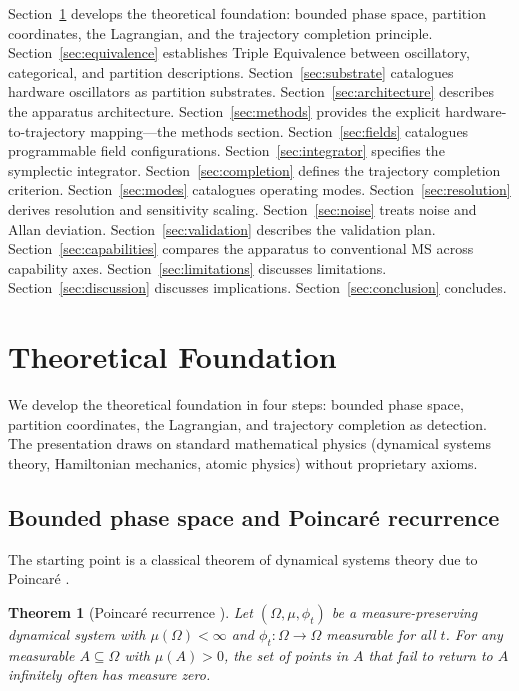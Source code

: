 \documentclass[twocolumn,11pt,a4paper]{article}
\newtheorem{theorem}{Theorem}[section]
\theoremstyle{definition}
\theoremstyle{remark}
\begin{document}
Section~\ref{sec:foundation} develops the theoretical foundation: bounded phase space, partition coordinates, the Lagrangian, and the trajectory completion principle. Section~\ref{sec:equivalence} establishes Triple Equivalence between oscillatory, categorical, and partition descriptions. Section~\ref{sec:substrate} catalogues hardware oscillators as partition substrates. Section~\ref{sec:architecture} describes the apparatus architecture. Section~\ref{sec:methods} provides the explicit hardware-to-trajectory mapping---the methods section. Section~\ref{sec:fields} catalogues programmable field configurations. Section~\ref{sec:integrator} specifies the symplectic integrator. Section~\ref{sec:completion} defines the trajectory completion criterion. Section~\ref{sec:modes} catalogues operating modes. Section~\ref{sec:resolution} derives resolution and sensitivity scaling. Section~\ref{sec:noise} treats noise and Allan deviation. Section~\ref{sec:validation} describes the validation plan. Section~\ref{sec:capabilities} compares the apparatus to conventional MS across capability axes. Section~\ref{sec:limitations} discusses limitations. Section~\ref{sec:discussion} discusses implications. Section~\ref{sec:conclusion} concludes.

\section{Theoretical Foundation}
\label{sec:foundation}

We develop the theoretical foundation in four steps: bounded phase space, partition coordinates, the Lagrangian, and trajectory completion as detection. The presentation draws on standard mathematical physics (dynamical systems theory, Hamiltonian mechanics, atomic physics) without proprietary axioms.

\subsection{Bounded phase space and Poincar\'{e} recurrence}

The starting point is a classical theorem of dynamical systems theory due to Poincar\'{e} \citep{poincare1890,arnold1989}.

\begin{theorem}[Poincar\'{e} recurrence \citep{poincare1890}]
\label{thm:poincare}
Let $(\Omega, \mu, \phi_t)$ be a measure-preserving dynamical system with $\mu(\Omega) < \infty$ and $\phi_t: \Omega \to \Omega$ measurable for all $t$. For any measurable $A \subseteq \Omega$ with $\mu(A) > 0$, the set of points in $A$ that fail to return to $A$ infinitely often has measure zero.
\end{theorem}
\end{document}
